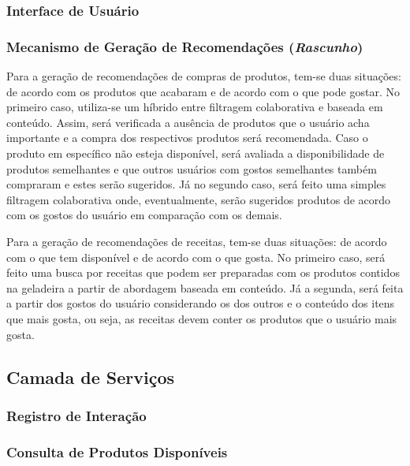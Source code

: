
\subsubsection{Interface de Usuário}

\subsubsection{Mecanismo de Geração de Recomendações (\textit{Rascunho})}

Para a geração de recomendações de compras de produtos, tem-se duas situações: de acordo com os produtos que acabaram e de acordo com o que pode gostar. No primeiro caso, utiliza-se um híbrido entre filtragem colaborativa e baseada em conteúdo. Assim, será verificada a ausência de produtos que o usuário acha importante e a compra dos respectivos produtos será recomendada. Caso o produto em específico não esteja disponível, será avaliada a disponibilidade de produtos semelhantes e que outros usuários com gostos semelhantes também compraram e estes serão sugeridos. Já no segundo caso, será feito uma simples filtragem colaborativa onde, eventualmente, serão sugeridos produtos de acordo com os gostos do usuário em comparação com os demais.

Para a geração de recomendações de receitas, tem-se duas situações: de acordo com o que tem disponível e de acordo com o que gosta. No primeiro caso, será feito uma busca por receitas que podem ser preparadas com os produtos contidos na geladeira a partir de abordagem baseada em conteúdo. Já a segunda, será feita a partir dos gostos do usuário considerando os dos outros e o conteúdo dos itens que mais gosta, ou seja, as receitas devem conter os produtos que o usuário mais gosta.

\subsection{Camada de Serviços}
\lipsum[1]

\subsubsection{Registro de Interação}

\subsubsection{Consulta de Produtos Disponíveis}

